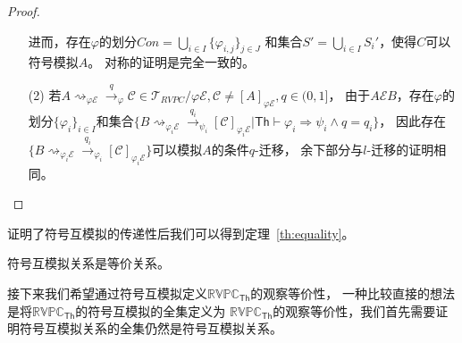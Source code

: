 \begin{proof}
\begin{itemize}
{         进而，存在$\varphi$的划分$Con=\bigcup_{i\in I}\{\varphi_{i,j}\}_{j\in J}$
         和集合$S'=\bigcup_{i\in I}S_i'$，使得$C$可以符号模拟$A$。
         对称的证明是完全一致的。
      }
      \item[(2)] {
         若$A\rightsquigarrow_{\varphi \mathcal{E}}\stackrel{q}{\rightarrow}_{\varphi} \mathcal{C}\in \mathcal{T}_{RVPC}/\varphi\mathcal{E},\mathcal{C}\neq [A]_{\varphi\mathcal{E}},q\in(0,1]$，
         由于$A\mathcal{E}B$，存在$\varphi$的划分$\{\varphi_i\}_{i\in I}$和集合$\{B\rightsquigarrow_{\varphi_i\mathcal{E}}\stackrel{q_i}{\rightarrow}_{\psi_i} [\mathcal{C}]_{\varphi_i\mathcal{E}}|\mathsf{Th}\vdash \varphi_i\Rightarrow \psi_i\wedge q=q_i\}$，
         因此存在$\{B\rightsquigarrow_{\varphi_i\mathcal{E}}\stackrel{q_i}{\rightarrow}_{\varphi_i} [\mathcal{C}]_{\varphi_i\mathcal{E}}\}$可以模拟$A$的条件$q$-迁移，
         余下部分与$l$-迁移的证明相同。
      }
   \end{itemize}
\end{proof}
证明了符号互模拟的传递性后我们可以得到定理~\ref{th:equality}。
\begin{theorem}\label{th:equality}
   符号互模拟关系是等价关系。
\end{theorem}

接下来我们希望通过符号互模拟定义$\mathbb{RVPC}_{\mathsf{Th}}$的观察等价性，
一种比较直接的想法是将$\mathbb{RVPC}_{\mathsf{Th}}$的符号互模拟的全集定义为
$\mathbb{RVPC}_{\mathsf{Th}}$的观察等价性，我们首先需要证明符号互模拟关系的全集仍然是符号互模拟关系。

